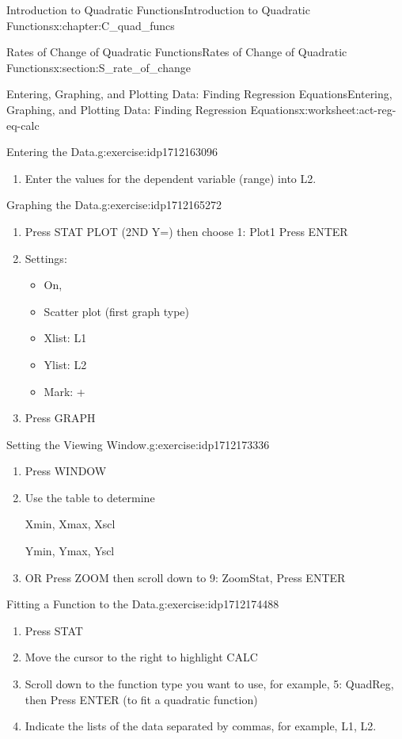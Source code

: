 \documentclass[oneside,10pt,]{book}
\numberwithin{equation}{chapter}
\begin{document}
\begin{chapterptx}{Introduction to Quadratic Functions}{}{Introduction to Quadratic Functions}{}{}{x:chapter:C_quad_funcs}
\begin{sectionptx}{Rates of Change of Quadratic Functions}{}{Rates of Change of Quadratic Functions}{}{}{x:section:S_rate_of_change}
\begin{worksheet-subsection}{Entering, Graphing, and Plotting Data: Finding Regression Equations}{}{Entering, Graphing, and Plotting Data: Finding Regression Equations}{}{}{x:worksheet:act-reg-eq-calc}
\begin{divisionexercise}{1}{Entering the Data.}{}{g:exercise:idp1712163096}
\begin{enumerate}[font=\bfseries,label=(\alph*),ref=\alph*]
\item{}Enter the values for the dependent variable (range) into L2.%
\end{enumerate}
\end{divisionexercise}%
\begin{divisionexercise}{2}{Graphing the Data.}{}{g:exercise:idp1712165272}%
\begin{enumerate}[font=\bfseries,label=(\alph*),ref=\alph*]
\item{}Press STAT PLOT (2ND Y=) then choose 1: Plot1\textellipsis{} Press ENTER%
\item{}Settings:%
\begin{itemize}[label=\textbullet]
\item{}On,%
\item{}Scatter plot (first graph type)%
\item{}Xlist: L1%
\item{}Ylist: L2%
\item{}Mark: +%
\end{itemize}
%
\item{}Press GRAPH%
\end{enumerate}
\end{divisionexercise}%
\begin{divisionexercise}{3}{Setting the Viewing Window.}{}{g:exercise:idp1712173336}%
\begin{enumerate}[font=\bfseries,label=(\alph*),ref=\alph*]
\item{}Press WINDOW%
\item{}Use the table to determine%
\par
Xmin, Xmax, Xscl%
\par
Ymin, Ymax, Yscl%
\item{}OR Press ZOOM then scroll down to 9: ZoomStat, Press ENTER%
\end{enumerate}
\end{divisionexercise}%
\begin{divisionexercise}{4}{Fitting a Function to the Data.}{}{g:exercise:idp1712174488}%
\begin{enumerate}[font=\bfseries,label=(\alph*),ref=\alph*]
\item{}Press STAT%
\item{}Move the cursor to the right to highlight CALC%
\item{}Scroll down to the function type you want to use, for example, 5: QuadReg, then Press ENTER (to fit a quadratic function)%
\item{}Indicate the lists of the data separated by commas, for example, L1, L2.%

\end{enumerate}
\end{divisionexercise}
\end{worksheet-subsection}
\end{sectionptx}
\end{chapterptx}
\end{document}

